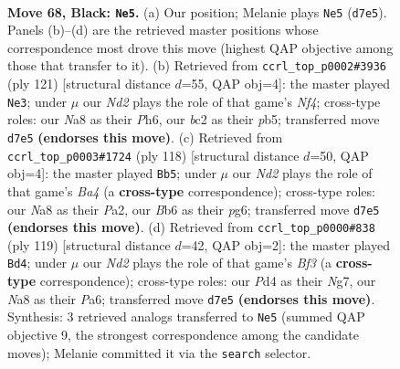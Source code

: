 \documentclass[11pt]{article}
\begin{document}
\clearpage

\begin{figure}[p]\centering
\begin{subfigure}{0.46\textwidth}\centering
\resizebox{\linewidth}{!}{%
\newchessgame
\chessboard[
  setfen={n4k2/3n4/1b1N4/p7/P2pP3/1P5p/2BKP3/8 b - - 3 68},
  showmover=false,
  pgfstyle=straightmove, color=movearrow, markmove={d7-e5}
]}
\caption{}
\end{subfigure}\hfill
\begin{subfigure}{0.46\textwidth}\centering
\resizebox{\linewidth}{!}{%
\newchessgame
\chessboard[
  setfen={8/p7/3kpp1p/PP1b1n1P/1K3P2/3N4/4B3/8 b - - 13 61},
  showmover=false,
  pgfstyle=straightmove, color=movearrow, markmove={f5-e3}
]}
\caption{}
\end{subfigure}
\\[4pt]
\begin{subfigure}{0.46\textwidth}\centering
\resizebox{\linewidth}{!}{%
\newchessgame
\chessboard[
  setfen={8/6k1/2K3p1/p5p1/B2p2P1/2b4P/P1P5/8 w - - 38 60},
  showmover=false,
  pgfstyle=straightmove, color=movearrow, markmove={a4-b5}
]}
\caption{}
\end{subfigure}\hfill
\begin{subfigure}{0.46\textwidth}\centering
\resizebox{\linewidth}{!}{%
\newchessgame
\chessboard[
  setfen={8/4k1n1/p2p1b2/B1pP3p/4B3/1P5P/6P1/5K2 b - - 0 60},
  showmover=false,
  pgfstyle=straightmove, color=movearrow, markmove={f6-d4}
]}
\caption{}
\end{subfigure}
\caption{\textbf{Move 68, Black: \texttt{Ne5}.} (a) Our position; Melanie plays \texttt{Ne5} (\texttt{d7e5}). Panels (b)--(d) are the retrieved master positions whose correspondence most drove this move (highest QAP objective among those that transfer to it). (b) Retrieved from \texttt{ccrl\_top\_p0002\#3936} (ply 121) [structural distance $d$=55, QAP obj=4]: the master played \texttt{Ne3}; under $\mu$ our \emph{Nd2} plays the role of that game's \emph{Nf4}; cross-type roles: our \emph{N}a8 as their \emph{P}h6, our \emph{b}c2 as their \emph{p}b5; transferred move \texttt{d7e5} \textbf{(endorses this move)}. (c) Retrieved from \texttt{ccrl\_top\_p0003\#1724} (ply 118) [structural distance $d$=50, QAP obj=4]: the master played \texttt{Bb5}; under $\mu$ our \emph{Nd2} plays the role of that game's \emph{Ba4} (a \textbf{cross-type} correspondence); cross-type roles: our \emph{N}a8 as their \emph{P}a2, our \emph{B}b6 as their \emph{p}g6; transferred move \texttt{d7e5} \textbf{(endorses this move)}. (d) Retrieved from \texttt{ccrl\_top\_p0000\#838} (ply 119) [structural distance $d$=42, QAP obj=2]: the master played \texttt{Bd4}; under $\mu$ our \emph{Nd2} plays the role of that game's \emph{Bf3} (a \textbf{cross-type} correspondence); cross-type roles: our \emph{P}d4 as their \emph{N}g7, our \emph{N}a8 as their \emph{P}a6; transferred move \texttt{d7e5} \textbf{(endorses this move)}. Synthesis: 3 retrieved analogs transferred to \texttt{Ne5} (summed QAP objective 9, the strongest correspondence among the candidate moves); Melanie committed it via the \texttt{search} selector.}
\label{fig:thought-m135}
\end{figure}
\end{document}
